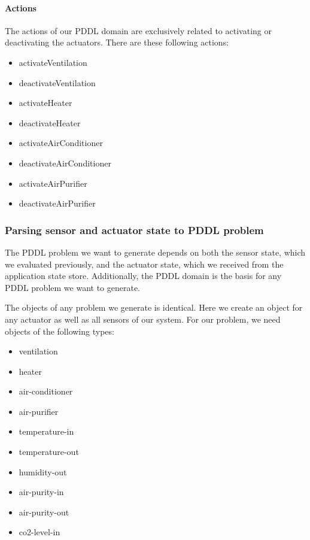 \documentclass[runningheads]{llncs}
\begin{document}
    \paragraph{Actions}
    The actions of our PDDL domain are exclusively related to activating or deactivating the actuators. There are these following actions: 
    \begin{itemize}
        \item activateVentilation
        \item deactivateVentilation
        \item activateHeater
        \item deactivateHeater
        \item activateAirConditioner
        \item deactivateAirConditioner
        \item activateAirPurifier
        \item deactivateAirPurifier
    \end{itemize}

    \subsubsection{Parsing sensor and actuator state to PDDL problem}
    The PDDL problem we want to generate depends on both the sensor state, which we evaluated previously, and the actuator state, which we received from the application state store. Additionally, the PDDL domain is the basis for any PDDL problem we want to generate. 

    The objects of any problem we generate is identical. Here we create an object for any actuator as well as all sensors of our system. For our problem, we need objects of the following types: 
    \begin{itemize}
        \item ventilation
        \item heater
        \item air-conditioner
        \item air-purifier
        \item temperature-in
        \item temperature-out
        \item humidity-out
        \item air-purity-in
        \item air-purity-out
        \item co2-level-in
    \end{itemize}
\end{document}
